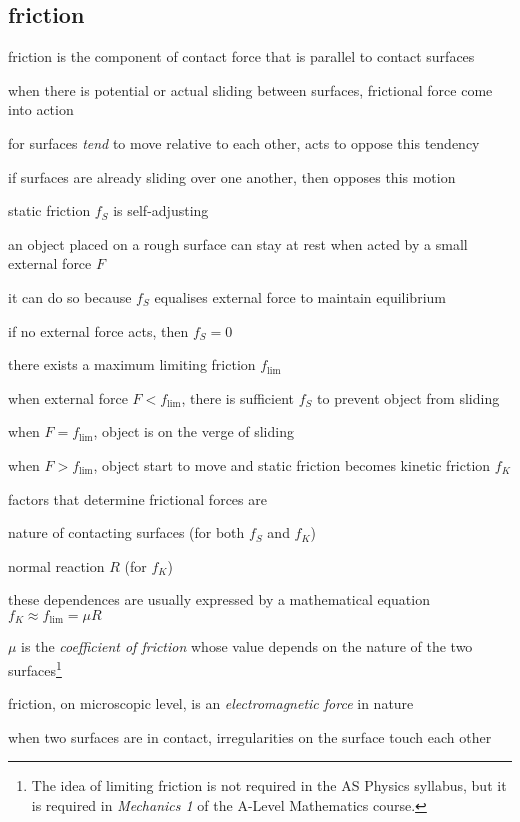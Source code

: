 {\subsection{friction}

friction is the component of contact force that is parallel to contact surfaces

when there is potential or actual sliding between surfaces, frictional force come into action

\titem for surfaces \emph{tend} to move relative to each other,  acts to oppose this tendency

\titem if surfaces are already sliding over one another, then  opposes this motion

\cmt static friction $f_S$ is self-adjusting

an object placed on a rough surface can stay at rest when acted by a small external force $F$

it can do so because $f_S$ equalises external force to maintain equilibrium

if no external force acts, then $f_S=0$

\cmt there exists a maximum limiting friction $f_\text{lim}$

when external force $F < f_\text{lim}$, there is sufficient $f_S$ to prevent object from sliding

when $F = f_\text{lim}$, object is on the verge of sliding

when $F>f_\text{lim}$, object start to move and static friction becomes kinetic friction $f_K$

\cmt factors that determine frictional forces are

\titem nature of contacting surfaces (for both $f_S$ and $f_K$)

\titem normal reaction $R$ (for $f_K$)

these dependences are usually expressed by a mathematical equation $\boxed{f_K \approx f_\text{lim} = \mu R}$

$\mu$ is the \emph{coefficient of friction} whose value depends on the nature of the two surfaces\footnote{The idea of limiting friction is not required in the AS Physics syllabus, but it is required in \emph{Mechanics 1} of the A-Level Mathematics course.}

\cmt friction, on microscopic level, is an \emph{electromagnetic force} in nature

when two surfaces are in contact, irregularities on the surface touch each other

}
